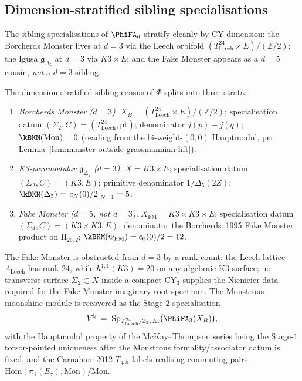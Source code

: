 \subsection{Dimension-stratified sibling specialisations}
\label{subsec:k3e-platonic-siblings}

The sibling specialisations of $\PhiFA_d$ stratify cleanly by CY dimension: the Borcherds Monster lives at $d = 3$ via the Leech orbifold $(T^{24}_{\mathrm{Leech}} \times E)/(\mathbb{Z}/2)$; the Igusa $\mathfrak{g}_{\Delta_5}$ at $d = 3$ via $K3 \times E$; and the Fake Monster appears as a $d = 5$ cousin, \emph{not} a $d = 3$ sibling.

\begin{conjecture}
\label{conj:plat-siblings-dim}
The dimension-stratified sibling census of $\Phi$ splits into three strata:
\begin{enumerate}[label=\textup{(\arabic*)}]
\item \emph{Borcherds Monster ($d = 3$).} $X_B = (T^{24}_{\mathrm{Leech}} \times E)/(\mathbb{Z}/2)$; specialisation datum $(\Sigma_2, C) = (T^{24}_{\mathrm{Leech}}, \mathrm{pt})$; denominator $j(p) - j(q)$; $\kBKM(\mathrm{Mon}) = 0$ (reading from the bi-weight-$(0, 0)$ Hauptmodul, per Lemma~\ref{lem:monster-outside-grassmannian-lift}).
\item \emph{K3-paramodular $\mathfrak{g}_{\Delta_5}$ ($d = 3$).} $X = K3 \times E$; specialisation datum $(\Sigma_2, C) = (K3, E)$; primitive denominator $1/\Delta_5(2Z)$; $\kBKM(\Delta_5) = \left.c_N(0)/2\right|_{N=1} = 5$.
\item \emph{Fake Monster ($d = 5$, not $d = 3$).} $X_{\mathrm{FM}} = K3 \times K3 \times E$; specialisation datum $(\Sigma_4, C) = (K3 \times K3, E)$; denominator the Borcherds~1995 Fake Monster product on $\mathrm{II}_{26, 2}$; $\kBKM(\Phi_{\mathrm{FM}}) = c_0(0)/2 = 12$.
\end{enumerate}
The Fake Monster is obstructed from $d = 3$ by a rank count: the Leech lattice $\Lambda_{\mathrm{Leech}}$ has rank $24$, while $h^{1, 1}(K3) = 20$ on any algebraic K3 surface; no transverse surface $\Sigma_2 \subset X$ inside a compact CY$_3$ supplies the Niemeier data required for the Fake Monster imaginary-root spectrum. The Monstrous moonshine module is recovered as the Stage-$2$ specialisation
\[
 V^\natural \;=\; \mathrm{Sp}_{T^{24}_{\mathrm{Leech}}/\mathbb{Z}_2,\, E_\tau}\!\bigl(\PhiFA_3(X_B)\bigr),
\]
with the Hauptmodul property of the McKay--Thompson series being the
Stage-$1$ torsor-pointed uniqueness after the Monstrous
formality/associator datum is fixed, and the Carnahan~2012 $T_{g, h}$-labels realising commuting pairs $\mathrm{Hom}(\pi_1(E_\tau), \mathrm{Mon})/\mathrm{Mon}$.
\end{conjecture}

